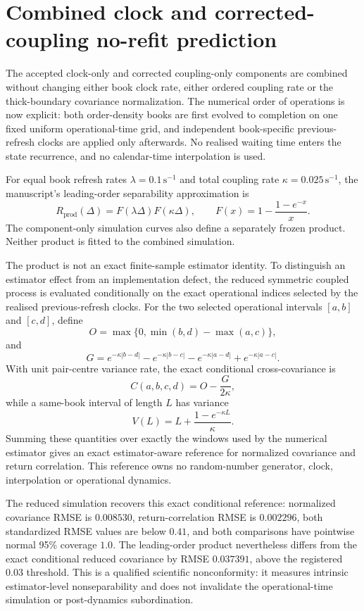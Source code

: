 
\section*{Combined clock and corrected-coupling no-refit prediction}

The accepted clock-only and corrected coupling-only components are combined
without changing either book clock rate, either ordered coupling rate or the
thick-boundary covariance normalization.  The numerical order of operations is
now explicit: both order-density books are first evolved to completion on one
fixed uniform operational-time grid, and independent book-specific
previous-refresh clocks are applied only afterwards.  No realised waiting time
enters the state recurrence, and no calendar-time interpolation is used.

For equal book refresh rates $\lambda=0.1\,\mathrm{s}^{-1}$ and total
coupling rate $\kappa=0.025\,\mathrm{s}^{-1}$, the manuscript's leading-order
separability approximation is
\[
  R_{\mathrm{prod}}(\Delta)
  =F(\lambda\Delta)F(\kappa\Delta),
  \qquad
  F(x)=1-\frac{1-e^{-x}}{x}.
\]
The component-only simulation curves also define a separately frozen product.
Neither product is fitted to the combined simulation.

The product is not an exact finite-sample estimator identity.  To distinguish
an estimator effect from an implementation defect, the reduced symmetric
coupled process is evaluated conditionally on the exact operational indices
selected by the realised previous-refresh clocks.  For the two selected
operational intervals $[a,b]$ and $[c,d]$, define
\[
  O=\max\{0,\min(b,d)-\max(a,c)\},
\]
and
\[
  G=e^{-\kappa|b-d|}-e^{-\kappa|b-c|}
    -e^{-\kappa|a-d|}+e^{-\kappa|a-c|}.
\]
With unit pair-centre variance rate, the exact conditional cross-covariance is
\[
  C(a,b,c,d)=O-\frac{G}{2\kappa},
\]
while a same-book interval of length $L$ has variance
\[
  V(L)=L+\frac{1-e^{-\kappa L}}{\kappa}.
\]
Summing these quantities over exactly the windows used by the numerical
estimator gives an exact estimator-aware reference for normalized covariance and return
correlation.  This reference owns no random-number generator, clock,
interpolation or operational dynamics.

The reduced simulation recovers this exact conditional reference: normalized
covariance RMSE is $0.008530$, return-correlation RMSE is $0.002296$, both
standardized RMSE values are below $0.41$, and both comparisons have pointwise
normal 95\% coverage $1.0$.  The leading-order product nevertheless differs
from the exact conditional reduced covariance by RMSE $0.037391$, above the
registered $0.03$ threshold.  This is a qualified scientific nonconformity:
it measures intrinsic estimator-level nonseparability and does not invalidate
the operational-time simulation or post-dynamics subordination.

